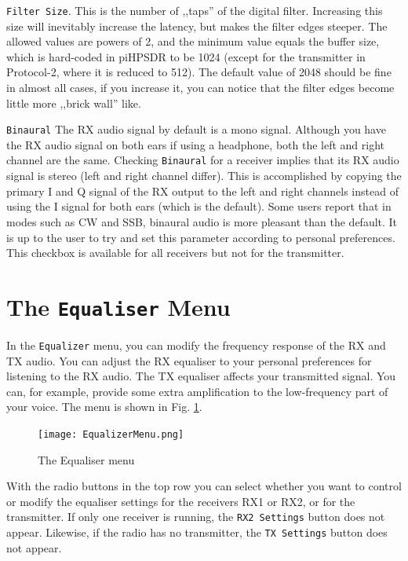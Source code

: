 \documentclass[12pt]{book}
\def\rett#1{\texttt{\color{red}#1}}
\def\bltt#1{\texttt{\color{blue}#1}}
\def\pH{pi\-HPSDR\xspace}
\begin{document}
\rett{Filter Size}. This is the number of ,,taps'' of the digital
filter. Increasing this size will inevitably increase the latency,
but makes the filter edges steeper. The allowed values are
powers of 2, and the minimum value equals the buffer size, which
is hard-coded in \pH to be 1024 (except for the transmitter in Protocol-2,
where it is reduced to 512). The default value of 2048 should be
fine in almost all cases, if you increase it, you can notice that
the filter edges become little more ,,brick wall'' like.

\rett{Binaural} The RX audio signal by default is a mono signal. Although
you have the RX audio signal on both ears if using a headphone, both the
left and right channel are the same. Checking \rett{Binaural} for a
receiver implies that its RX audio signal is stereo (left and right channel
differ). This is accomplished by copying the primary I and Q signal of the
RX output to the left and right channels instead of using the I signal
for both ears (which is the default). Some users report that in modes
such as CW and SSB, binaural audio is more pleasant than the default.
It is up to the user to try and set this parameter according to personal
preferences. This checkbox is available for all receivers but not for the
transmitter.

\section{The \texttt{Equaliser} Menu}

In the \bltt{Equalizer} menu, you can modify the frequency response of
the RX and TX audio. You can adjust the RX equaliser to your personal
preferences for listening to the RX audio. The TX equaliser affects
your transmitted signal. You can, for example, provide some extra
amplification to the low-frequency part of your voice. The menu
is shown in Fig. \ref{fig:EqualizerMenu}.

\begin{figure}[ht]
\center
\texttt{[image: EqualizerMenu.png]}
\caption{The Equaliser menu}
\label{fig:EqualizerMenu}
\end{figure}

With the radio buttons in the top row you can select
whether you want to control or modify the equaliser settings for the receivers
RX1 or RX2, or for the transmitter. If only one receiver is running,
the \rett{RX2 Settings} button does not appear. Likewise, if the radio
has no transmitter, the \rett{TX Settings} button does not appear.
\end{document}
